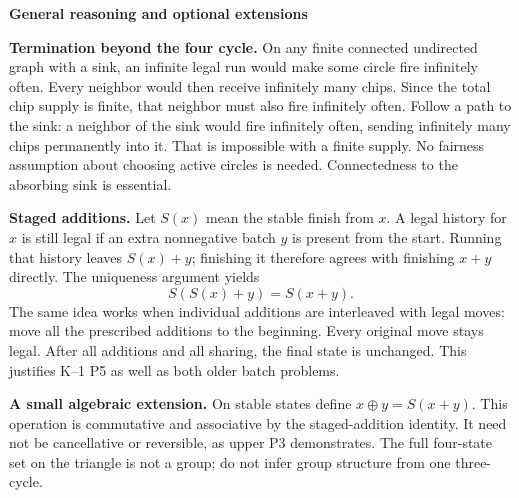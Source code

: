 \documentclass[11pt,letterpaper]{article}
\newcommand{\pagehead}[1]{{\Large\bfseries #1}\par\vspace{3pt}}
\begin{document}
\newpage
\pagehead{General reasoning and optional extensions}
\textbf{Termination beyond the four cycle.} On any finite connected undirected graph with a sink, an infinite legal run would make some circle fire infinitely often. Every neighbor would then receive infinitely many chips. Since the total chip supply is finite, that neighbor must also fire infinitely often. Follow a path to the sink: a neighbor of the sink would fire infinitely often, sending infinitely many chips permanently into it. That is impossible with a finite supply. No fairness assumption about choosing active circles is needed. Connectedness to the absorbing sink is essential.

\textbf{Staged additions.} Let $S(x)$ mean the stable finish from $x$. A legal history for $x$ is still legal if an extra nonnegative batch $y$ is present from the start. Running that history leaves $S(x)+y$; finishing it therefore agrees with finishing $x+y$ directly. The uniqueness argument yields
\[
S(S(x)+y)=S(x+y).
\]
The same idea works when individual additions are interleaved with legal moves: move all the prescribed additions to the beginning. Every original move stays legal. After all additions and all sharing, the final state is unchanged. This justifies K--1 P5 as well as both older batch problems.

\textbf{A small algebraic extension.} On stable states define $x\mathbin{\oplus}y=S(x+y)$. This operation is commutative and associative by the staged-addition identity. It need not be cancellative or reversible, as upper P3 demonstrates. The full four-state set on the triangle is not a group; do not infer group structure from one three-cycle.
\end{document}
